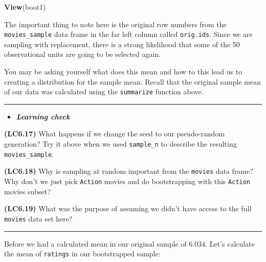 \documentclass[]{tufte-book}
\newenvironment{Shaded}{\begin{snugshade}}{\end{snugshade}}
\newcommand{\KeywordTok}[1]{\textcolor[rgb]{0.13,0.29,0.53}{\textbf{{#1}}}}
\newcommand{\DataTypeTok}[1]{\textcolor[rgb]{0.13,0.29,0.53}{{#1}}}
\newcommand{\StringTok}[1]{\textcolor[rgb]{0.31,0.60,0.02}{{#1}}}
\newcommand{\NormalTok}[1]{{#1}}
\let\oldrule=\rule
\renewcommand{\rule}[1]{\oldrule{\linewidth}}
\newenvironment{rmdblock}[1]
  {\begin{shaded*}
  \begin{itemize}
  \renewcommand{\labelitemi}{
    \raisebox{-.7\height}[0pt][0pt]{
    }
  }
  \item
  }
  {
  \end{itemize}
  \end{shaded*}
  }
\newenvironment{learncheck}
  {\begin{rmdblock}{warning}}
  {\end{rmdblock}}
\begin{document}
\begin{Shaded}
\begin{Highlighting}[]
\KeywordTok{View}\NormalTok{(boot1)}
\end{Highlighting}
\end{Shaded}

The important thing to note here is the original row numbers from the
\texttt{movies\_sample} data frame in the far left column called
\texttt{orig.ids}. Since we are sampling with replacement, there is a
strong likelihood that some of the 50 observational units are going to
be selected again.

You may be asking yourself what does this mean and how to this lead us
to creating a distribution for the sample mean. Recall that the original
sample mean of our data was calculated using the \texttt{summarize}
function above.

\begin{center}\rule{0.5\linewidth}{\linethickness}\end{center}

\begin{learncheck}
\textbf{\emph{Learning check}}
\end{learncheck}

\textbf{(LC6.17)} What happens if we change the seed to our
pseudo-random generation? Try it above when we used \texttt{sample\_n}
to describe the resulting \texttt{movies\_sample}.

\textbf{(LC6.18)} Why is sampling at random important from the
\texttt{movies} data frame? Why don't we just pick \texttt{Action}
movies and do bootstrapping with this \texttt{Action} movies subset?

\textbf{(LC6.19)} What was the purpose of assuming we didn't have access
to the full \texttt{movies} data set here?

\begin{center}\rule{0.5\linewidth}{\linethickness}\end{center}

Before we had a calculated mean in our original sample of 6.034. Let's
calculate the mean of \texttt{ratings} in our bootstrapped sample:

\begin{Shaded}
\end{Shaded}
\end{document}
